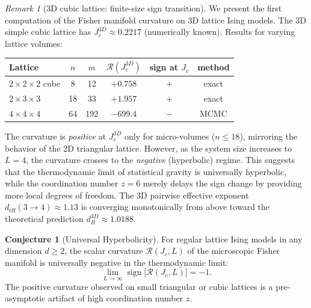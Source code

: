\documentclass[11pt]{article}
\theoremstyle{definition}
\newtheorem{conjecture}[theorem]{Conjecture}
\theoremstyle{remark}
\newtheorem{remark}[theorem]{Remark}
\newcommand{\Scal}{\mathcal{R}}
\begin{document}
\begin{remark}[3D cubic lattice: finite-size sign transition]
\label{rem:3d-lattice}
We present the first computation of the Fisher manifold curvature on
3D lattice Ising models. The 3D simple cubic lattice has
$J_c^{3D} \approx 0.2217$ (numerically known). Results for varying
lattice volumes:
\begin{center}
\renewcommand{\arraystretch}{1.15}
\begin{tabular}{lccccc}
\toprule
Lattice & $n$ & $m$ & $\Scal(J_c^{3D})$ & sign at $J_c$ & method \\
\midrule
$2{\times}2{\times}2$ cube & 8 & 12 & $+0.758$ & $+$ & exact \\
$2{\times}3{\times}3$ & 18 & 33 & $+1.957$ & $+$ & exact \\
$4{\times}4{\times}4$ & 64 & 192 & $-699.4$ & $-$ & MCMC \\
\bottomrule
\end{tabular}
\end{center}
The curvature is \emph{positive} at $J_c^{3D}$ only for micro-volumes
($n \leq 18$), mirroring the behavior of the 2D triangular lattice.
However, as the system size increases to $L = 4$, the curvature crosses
to the \emph{negative} (hyperbolic) regime. This suggests that the
thermodynamic limit of statistical gravity is universally hyperbolic,
while the coordination number $z = 6$ merely delays the sign change by
providing more local degrees of freedom.
The 3D pairwise effective exponent $d_{\mathrm{eff}}(3 \to 4) \approx 1.13$
is converging monotonically from above toward the theoretical prediction
$d_R^{3D} \approx 1.0188$.
\end{remark}

\begin{conjecture}[Universal Hyperbolicity]
\label{conj:universal-hyper}
For regular lattice Ising models in any dimension $d \geq 2$,
the scalar curvature $\Scal(J_c, L)$ of the microscopic Fisher manifold
is universally negative in the thermodynamic limit:
\begin{equation}
  \lim_{L \to \infty} \operatorname{sign}\bigl[\Scal(J_c, L)\bigr] = -1.
  \label{eq:universal-hyper}
\end{equation}
The positive curvature observed on small triangular or cubic lattices
is a pre-asymptotic artifact of high coordination number $z$.
\end{conjecture}
\end{document}

